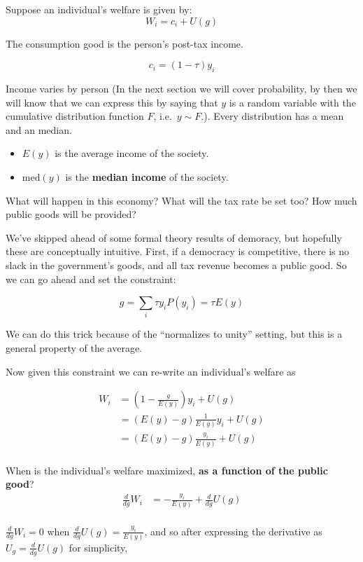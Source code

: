 \documentclass[
]{book}
\providecommand{\tightlist}{%
  \setlength{\itemsep}{0pt}\setlength{\parskip}{0pt}}
\theoremstyle{definition}
\theoremstyle{definition}
\theoremstyle{definition}
\theoremstyle{definition}
\theoremstyle{remark}
\begin{document}
Suppose an individual's welfare is given by:
\[W_i = c_i + U(g)\]

The consumption good is the person's post-tax income.

\[c_i = (1 - \tau) y_i\]

Income varies by person (In the next section we will cover probability, by then we will know that we can express this by saying that \(y\) is a random variable with the cumulative distribution function \(F\), i.e.~\(y \sim F\).). Every distribution has a mean and an median.

\begin{itemize}
\tightlist
\item
  \(E(y)\) is the average income of the society.
\item
  \(\text{med}(y)\) is the \textbf{median income} of the society.
\end{itemize}

What will happen in this economy? What will the tax rate be set too? How much public goods will be provided?

We've skipped ahead of some formal theory results of demoracy, but hopefully these are conceptually intuitive. First, if a democracy is competitive, there is no slack in the government's goods, and all tax revenue becomes a public good. So we can go ahead and set the constraint:

\[g = \sum_{i} \tau y_i P(y_i) = \tau E(y)\]

We can do this trick because of the ``normalizes to unity'' setting, but this is a general property of the average.

Now given this constraint we can re-write an individual's welfare as

\begin{align*}
W_i &= \left(1 - \frac{g}{E(y)}\right)y_i + U(g)\\
&= \left(E(y) - g\right) \frac{1}{E(y)} y_i + U(g)\\
&= \left(E(y) - g\right) \frac{y_i}{E(y)} + U(g)\\
\end{align*}

When is the individual's welfare maximized, \textbf{as a function of the public good}?
\begin{align*}
\frac{d}{dg}W_i &=  - \frac{y_i}{E(y)} + \frac{d}{dg}U(g)\\
\end{align*}

\(\frac{d}{dg}W_i = 0\) when \(\frac{d}{dg}U(g) = \frac{y_i}{E(y)}\), and so after expressing the derivative as \(U_g = \frac{d}{dg}U(g)\) for simplicity,
\end{document}
